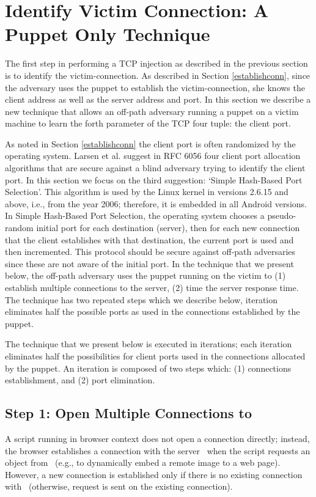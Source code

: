 \documentclass[conference]{IEEEtran}
\begin{document}
\section{Identify Victim Connection: A Puppet Only Technique} \label{clientport}

The first step in performing a TCP injection as described in the previous section is to identify the victim-connection. As described in Section \ref{establishconn}, since the adversary uses the puppet to establish the victim-connection, she knows the client address as well as the server address and port. In this section we describe a new technique that allows an off-path adversary running a puppet on a victim machine to learn the forth parameter of the TCP four tuple: the client port. 

As noted in Section \ref{establishconn} the client port is often randomized by the operating system. Larsen et al. suggest in RFC 6056 \cite{rfc6056} four client port allocation algorithms that are secure against a blind adversary trying to identify the client port. In this section we focus on the third suggestion: `Simple Hash-Based Port Selection'. This algorithm is used by the Linux kernel in versions 2.6.15 and above, i.e., from the year 2006; therefore, it is embedded in all Android versions. In Simple Hash-Based Port Selection, the operating system chooses a pseudo-random initial port for each destination (server), then for each new connection that the client establishes with that destination, the current port is used and then incremented. This protocol should be secure against off-path adversaries since these are not aware of the initial port. In the technique that we present below, the off-path adversary uses the puppet running on the victim to (1) establish multiple connections to the server, (2) time the server response time. 
The technique has two repeated steps which we describe below, iteration eliminates half the possible ports as used in the connections established by the puppet.

The technique that we present below is executed in iterations; each iteration eliminates half the possibilities for client ports used in the connections allocated by the puppet. An iteration is composed of two steps which: (1) connections establishment, and (2) port elimination.

\subsection{Step 1: Open Multiple Connections to \lin}
A script running in browser context does not open a connection directly; instead, the browser establishes a connection with the server \lin\ when the script requests an object from \lin\ (e.g., to dynamically embed a remote image to a web page). However, a new connection is established only if there is no existing connection with \lin\ (otherwise, request is sent on the existing connection). 
\end{document}
